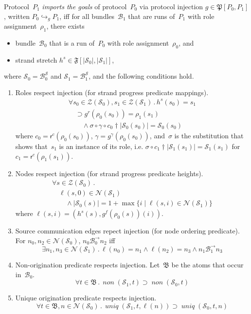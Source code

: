 \documentclass[12pt]{article}
\newcommand{\fn}[1]{\ensuremath{\operatorname{\mathit{#1}}}}
\newcommand{\prefix}[2]{#1\dagger#2}
\newcommand{\all}[1]{\forall#1\mathpunct.}
\newcommand{\some}[1]{\exists#1\mathpunct.}
\newcommand{\alg}[1]{\ensuremath{\mathfrak{#1}}}
\newcommand{\atm}{\alg{B}}
\newcommand{\ssp}{\ensuremath{\mathcal{S}}}
\newcommand{\bun}{\ensuremath{\mathcal{B}}}
\newcommand{\strands}{\ensuremath{\mathcal{Z}}}
\newcommand{\nodes}{\ensuremath{\mathcal{N}}}
\newcommand{\rl}{\ensuremath{\rho}}
\newcommand{\role}{\mathsf{r}}
\begin{document}
Protocol~$P_1$ \emph{imports the goals} of protocol~$P_0$ via
protocol injection $g\in\alg{P}[P_0,P_1]$, written
$P_0\hookrightarrow_g P_1$, iff for all bundles~$\bun_1$ that are runs
of~$P_1$ with role assignment~$\rl_1$, there exists
\begin{itemize}
\item bundle~$\bun_0$ that is a run of~$P_0$ with role
  assignment~$\rl_0$, and
\item strand stretch $h^s\in\alg{F}[|\ssp_0|, |\ssp_1|]$,
\end{itemize}
where $\ssp_0=\bun^\ssp_0$ and $\ssp_1=\bun^\ssp_1$, and the following
conditions hold.
\begin{enumerate}

\item\label{item: role mappings} Roles respect injection (for strand
  progress predicate mappings).
  \[\begin{array}{l}
  \all{s_0\in\strands(\ssp_0),s_1\in\strands(\ssp_1)}h^s(s_0) =
  s_1\\ \quad\supset
  g^r(\rl_0(s_0))=\rl_1(s_1)\\ \qquad{}\land\sigma\circ
  \gamma\circ\prefix{c_0}{|\ssp_0(s_0)|}
  = \ssp_0(s_0)
  \end{array}\]
  where $c_0=\role^c(\rl_0(s_0))$,
  $\gamma=g^\gamma(\rl_0(s_0))$, and~$\sigma$ is the substitution that
  shows that~$s_1$ is an instance of its role, i.e.\@
  $\sigma\circ\prefix{c_1}{|\ssp_1(s_1)|}=\ssp_1(s_1)$ for
  $c_1=\role^c(\rl_1(s_1))$.

\item\label{item: role heights} Nodes respect injection (for strand
  progress predicate heights).
  \[\begin{array}{l}
  \all{s\in\strands(\ssp_0)}\\
  \quad\ell(s,0)\in\nodes(\ssp_1)\\
  \qquad{}\land|\ssp_0(s)|=1+\max
  \{i\mid\ell(s,i)\in\nodes(\ssp_1)\}
  \end{array}\]
  where $\ell(s,i)=(h^s(s),g^f(\rl_0(s))(i))$.

\item\label{item: node orderings} Source communication edges repect
  injection (for node ordering predicate).  For
  $n_0,n_2\in\nodes(\ssp_0)$, $n_0\mathbin{\bun^\to_0} n_2$ iff
  \[\some{n_1,n_3\in\nodes(\ssp_1)}\ell(n_0)=n_1\land\ell(n_2)=n_3\land
  n_1\mathbin{\bun^\to_1} n_3\]

\item\label{item: nons} Non-origination predicate respects injection.
  Let~$\atm$ be the atoms that occur in~$\bun_0$.
  \[\all{t\in\atm}\fn{non}(\ssp_1, t)\supset\fn{non}(\ssp_0, t)\]

\item\label{item: uniques} Unique origination predicate respects injection.
  \[\all{t\in\atm,n\in\nodes(\ssp_0)}\fn{uniq}(\ssp_1,
  t,\ell(n))\supset\fn{uniq}(\ssp_0, t,n)\]
\end{enumerate}
\end{document}
